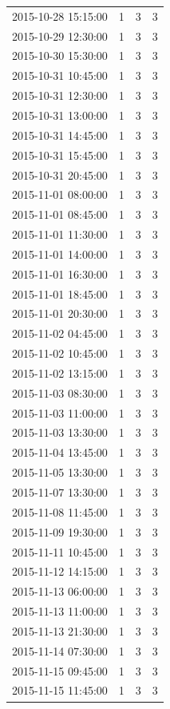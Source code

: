 \begin{tabular}{lrrr}
2015-10-28 15:15:00 & 1 & 3 & 3 \\
2015-10-29 12:30:00 & 1 & 3 & 3 \\
2015-10-30 15:30:00 & 1 & 3 & 3 \\
2015-10-31 10:45:00 & 1 & 3 & 3 \\
2015-10-31 12:30:00 & 1 & 3 & 3 \\
2015-10-31 13:00:00 & 1 & 3 & 3 \\
2015-10-31 14:45:00 & 1 & 3 & 3 \\
2015-10-31 15:45:00 & 1 & 3 & 3 \\
2015-10-31 20:45:00 & 1 & 3 & 3 \\
2015-11-01 08:00:00 & 1 & 3 & 3 \\
2015-11-01 08:45:00 & 1 & 3 & 3 \\
2015-11-01 11:30:00 & 1 & 3 & 3 \\
2015-11-01 14:00:00 & 1 & 3 & 3 \\
2015-11-01 16:30:00 & 1 & 3 & 3 \\
2015-11-01 18:45:00 & 1 & 3 & 3 \\
2015-11-01 20:30:00 & 1 & 3 & 3 \\
2015-11-02 04:45:00 & 1 & 3 & 3 \\
2015-11-02 10:45:00 & 1 & 3 & 3 \\
2015-11-02 13:15:00 & 1 & 3 & 3 \\
2015-11-03 08:30:00 & 1 & 3 & 3 \\
2015-11-03 11:00:00 & 1 & 3 & 3 \\
2015-11-03 13:30:00 & 1 & 3 & 3 \\
2015-11-04 13:45:00 & 1 & 3 & 3 \\
2015-11-05 13:30:00 & 1 & 3 & 3 \\
2015-11-07 13:30:00 & 1 & 3 & 3 \\
2015-11-08 11:45:00 & 1 & 3 & 3 \\
2015-11-09 19:30:00 & 1 & 3 & 3 \\
2015-11-11 10:45:00 & 1 & 3 & 3 \\
2015-11-12 14:15:00 & 1 & 3 & 3 \\
2015-11-13 06:00:00 & 1 & 3 & 3 \\
2015-11-13 11:00:00 & 1 & 3 & 3 \\
2015-11-13 21:30:00 & 1 & 3 & 3 \\
2015-11-14 07:30:00 & 1 & 3 & 3 \\
2015-11-15 09:45:00 & 1 & 3 & 3 \\
2015-11-15 11:45:00 & 1 & 3 & 3 \\

\end{tabular}
